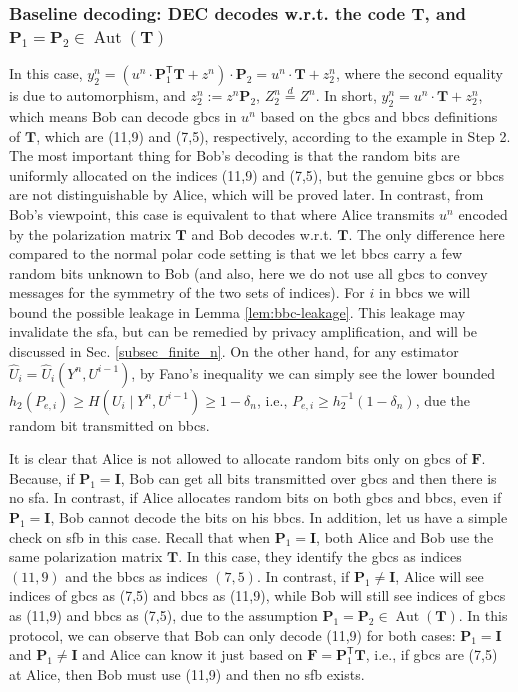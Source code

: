 \documentclass[onecolumn]{IEEEtran} %
\newcommand{\bP}{\mathbf P}
\newcommand{\bF}{\mathbf F}
\newcommand{\bI}{\mathbf I}
\newcommand{\1}{\mathbbm{1}}
\DeclareMathOperator{\Aut}{Aut}
\theoremstyle{boldremark}
\newcommand{\bT}{\mathbf{T}}
\begin{document}
\subsubsection{Baseline decoding: DEC decodes w.r.t. the code $\bT$, and $\bP_1=\bP_2\in \Aut(\bT)$} 
In this case, $y_2^n=(u^n\cdot\bP_1^{\mathsf T}\bT+z^n)\cdot\bP_2=u^n\cdot\bT+z_2^n$, where the second equality is due to automorphism, and $z_2^n:=z^n\bP_2$, $Z_2^n\overset{d}=Z^n$. In short, $y_2^n=u^n\cdot\bT+z_2^n$, which means Bob can decode \gls{gbcs} in $u^n$ based on the \gls{gbcs} and \gls{bbcs} definitions of $\bT$, which are (11,9) and (7,5), respectively, according to the example in Step 2. The most important thing for Bob's decoding is that the random bits are uniformly allocated on the indices (11,9) and (7,5), but the genuine \gls{gbcs} or \gls{bbcs} are not distinguishable by Alice, which will be proved later. In contrast, from Bob's viewpoint, this case is equivalent to that where Alice transmits $u^n$ encoded by the polarization matrix $\bT$ and Bob decodes w.r.t. $\bT$. The only difference here compared to the normal polar code setting is that we let \gls{bbcs} carry a few random bits unknown to Bob (and also, here we do not use all \gls{gbcs} to convey messages for the symmetry of the two sets of indices). For $i$ in \gls{bbcs} we will bound the possible leakage in Lemma \ref{lem:bbc-leakage}. This leakage may invalidate the \gls{sfa}, but can be remedied by privacy amplification, and will be discussed in Sec. \ref{subsec_finite_n}. On the other hand, for any estimator $\hat U_i=\hat U_i(Y^n,U^{i-1})$, by Fano’s inequality we can simply see the lower bounded $h_2(P_{e,i})\ge H(U_i\!\mid Y^n,U^{i-1})\ge 1-\delta_n$, i.e., $P_{e,i}\ge h_2^{-1}(1-\delta_n)$, due the random bit transmitted on \gls{bbcs}.

It is clear that Alice is not allowed to allocate random bits only on \gls{gbcs} of $\bF$. Because, if $\bP_1=\bI$, Bob can get all bits transmitted over \gls{gbcs} and then there is no \gls{sfa}. In contrast, if Alice allocates random bits on both \gls{gbcs} and \gls{bbcs}, even if $\bP_1=\bI$, Bob cannot decode the bits on his \gls{bbcs}. In addition, let us have a simple check on \gls{sfb} in this case. Recall that when $\bP_{1}=\bI$, both Alice and Bob use the same polarization matrix $\bT$. In this case, they identify the \gls{gbcs} as indices $(11,9)$ and the \gls{bbcs} as indices $(7,5)$. In contrast, if $\bP_1\neq\bI$, Alice will see indices of \gls{gbcs} as (7,5) and \gls{bbcs} as (11,9), while Bob will still see indices of \gls{gbcs} as (11,9) and \gls{bbcs} as (7,5), due to the assumption $\bP_1=\bP_2\in\Aut(\bT)$. In this protocol, we can observe that Bob can only decode (11,9) for both cases: $\bP_1=\bI$ and $\bP_1\neq\bI$ and Alice can know it just based on $\bF=\bP_1^{\mathsf T}\bT$, i.e., if \gls{gbcs} are (7,5) at Alice, then Bob must use (11,9) and then no \gls{sfb} exists. 
    
\end{document}
